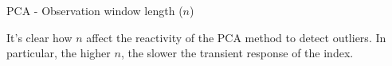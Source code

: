 \begin{frame}{PCA - Observation window length ($n$)}
\begin{figure}[H]
{        }
    \end{figure}

    \vspace{-9pt}

    It's clear how $n$ affect the reactivity of the PCA method to detect outliers.
    In particular, the higher $n$, the slower the transient response of the index.

\end{frame}